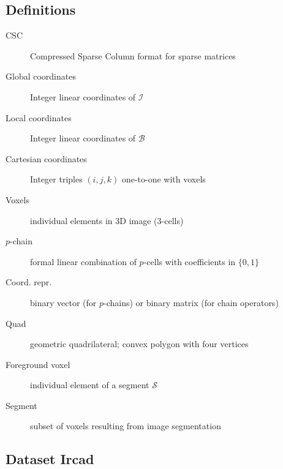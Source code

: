 \documentclass[11pt, oneside]{article}   	%
\begin{document}
\subsection{Definitions}
\begin{description}
\item[CSC]  Compressed Sparse Column format for sparse matrices
\\[-8mm]
\item[Global coordinates]  Integer linear coordinates of $\mathcal{I}$
\\[-8mm]
\item[Local coordinates] Integer linear coordinates of $\mathcal{B}$
\\[-8mm]
\item[Cartesian coordinates] Integer triples $(i,j,k)$ one-to-one with voxels 
\\[-8mm]
\item[Voxels] individual elements in 3D image (3-cells)
\\[-8mm]
\item[$p$-chain] formal linear combination of $p$-cells with coefficients in $\{0,1\}$
\\[-8mm]
\item[Coord. repr.]  binary vector (for $p$-chains) or binary matrix (for chain operators)
\\[-8mm]
\item[Quad]	geometric quadrilateral; convex polygon with four vertices 
\\[-8mm]
\item[Foreground voxel] individual element of a segment $\mathcal{S}$
\\[-8mm]
\item[Segment]	subset of voxels resulting from image segmentation
\end{description}

\subsection{Dataset Ircad}

\begin{table}

\label{tab:ircad1}
\end{table}

\begin{table}

\label{tab:ircad2}
\end{table}

\clearpage{}


\end{document}
